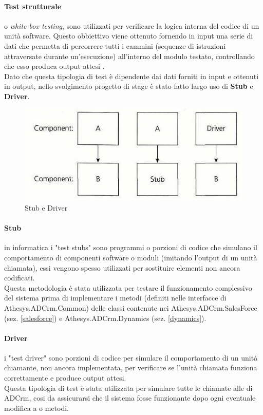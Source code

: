\documentclass[12pt,a4paper,twoside,openany,english]{book}
\begin{document}
\paragraph{Test strutturale}
o \textit{white box testing}, sono utilizzati per verificare la logica interna del codice di un unità software. Questo obbiettivo viene ottenuto fornendo in input una serie di dati che permetta di percorrere tutti i cammini (sequenze di istruzioni attraversate durante un'esecuzione) all'interno del modulo testato, controllando che esso produca output attesi .\\
Dato che questa tipologia di test è dipendente dai dati forniti in input e ottenuti in output, nello svolgimento progetto di stage è stato fatto largo uso di \textbf{Stub} e \textbf{Driver}.

\begin{figure}[H]
	\centering
	\includegraphics[width=\linewidth]{images/stubDriver}
	\caption{Stub e Driver}
	\label{fig:stubdriver}
\end{figure}

\paragraph{Stub} 
in informatica i "test stubs" sono programmi o porzioni di codice che simulano il comportamento di componenti software o moduli (imitando l'output di un unità chiamata), essi vengono spesso utilizzati per sostituire elementi non ancora codificati.\\
Questa metodologia è stata utilizzata per testare il funzionamento complessivo del sistema prima di implementare i metodi (definiti nelle interfacce di Athesys.ADCrm.Common) delle classi contenute nei  Athesys.ADCrm.SalesForce (sez. \ref{salesforce}) e Athesys.ADCrm.Dynamics (sez. \ref{dynamics}).

\paragraph{Driver} 
i "test driver" sono porzioni di codice per simulare il comportamento di un unità chiamante, non ancora implementata, per verificare se l'unità chiamata funziona correttamente e produce output attesi.\\
Questa tipologia di test è stata utilizzata per simulare tutte le chiamate alle  di ADCrm, cosi da assicurarsi che il sistema fosse funzionante dopo ogni eventuale modifica a  o metodi.
\end{document}
